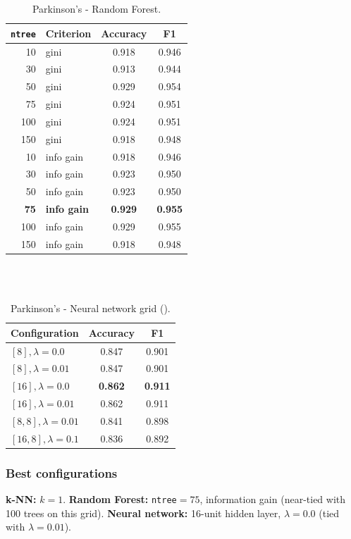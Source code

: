 \documentclass[11pt]{article}
\newcommand{\filepath}[1]{\texttt{\detokenize{#1}}}
\begin{document}
\begin{table}[htbp]
  \centering
  \footnotesize
  \caption{Parkinson's - Random Forest.}
  \label{tab:park-rf}
  \begin{tabular}{r l cc}
    \toprule
    \texttt{ntree} & Criterion & Accuracy & F1 \\
    \midrule
    10 & gini & 0.918 & 0.946 \\
    30 & gini & 0.913 & 0.944 \\
    50 & gini & 0.929 & 0.954 \\
    75 & gini & 0.924 & 0.951 \\
    100 & gini & 0.924 & 0.951 \\
    150 & gini & 0.918 & 0.948 \\
    \midrule
    10 & info gain & 0.918 & 0.946 \\
    30 & info gain & 0.923 & 0.950 \\
    50 & info gain & 0.923 & 0.950 \\
    \textbf{75} & \textbf{info gain} & \textbf{0.929} & \textbf{0.955} \\
    100 & info gain & 0.929 & 0.955 \\
    150 & info gain & 0.918 & 0.948 \\
    \bottomrule
  \end{tabular}
\end{table}
\\ \\
\begin{table}[htbp]
  \centering
  \footnotesize
  \caption{Parkinson's - Neural network grid (\filepath{parkinsons.py}).}
  \label{tab:park-nn}
  \begin{tabular}{l cc}
    \toprule
    Configuration & Accuracy & F1 \\
    \midrule
    $[8], \lambda{=}0.0$ & 0.847 & 0.901 \\
    $[8], \lambda{=}0.01$ & 0.847 & 0.901 \\
    \textbf{$[16], \lambda{=}0.0$} & \textbf{0.862} & \textbf{0.911} \\
    $[16], \lambda{=}0.01$ & 0.862 & 0.911 \\
    $[8,8], \lambda{=}0.01$ & 0.841 & 0.898 \\
    $[16,8], \lambda{=}0.1$ & 0.836 & 0.892 \\
    \bottomrule
  \end{tabular}
\end{table}

\subsubsection{Best configurations}
\textbf{k-NN:} $k=1$. \newline
\textbf{Random Forest:} \texttt{ntree}$=75$, information gain (near-tied with 100 trees on this grid). \newline
\textbf{Neural network:} 16-unit hidden layer, $\lambda=0.0$ (tied with $\lambda=0.01$).
\end{document}

